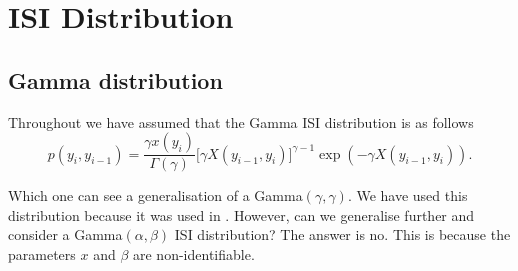 \documentclass[../main.tex]{subfiles}
\begin{document}
\section{ISI Distribution}
\subsection{Gamma distribution}
Throughout we have assumed that the Gamma ISI distribution is as follows 
\begin{equation}
 p(y_i, y_{i-1}) =  \frac{\gamma x(y_i)}{\Gamma ( \gamma )} \big[ \gamma X(y_{i-1} , y_i ) \big]^{\gamma -1} \exp( - \gamma X(y_{i-1} , y_i )  ).
 \end{equation}
 
 Which one can see a generalisation of a Gamma$(\gamma,\gamma)$. We have used this distribution because it was used in \cite{}. However, can we generalise further and consider a Gamma$(\alpha,\beta)$ ISI distribution? The answer is no. This is because the parameters $x$ and $\beta$ are non-identifiable.  \\
 
\end{document}
